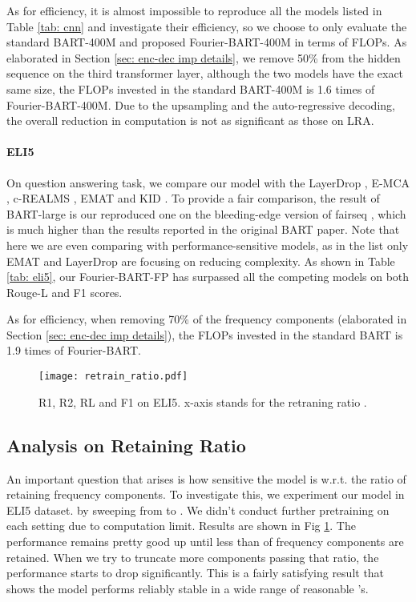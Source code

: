 \documentclass[11pt]{article}
\begin{document}
As for efficiency, it is almost impossible to reproduce all the models listed in Table \ref{tab: cnn} and investigate their efficiency, so we choose to only evaluate the standard BART-400M and proposed Fourier-BART-400M in terms of FLOPs. 
As elaborated in Section \ref{sec: enc-dec imp details}, we remove 50\% from the hidden sequence on the third transformer layer, although the two models have the exact same size, the FLOPs invested in the standard BART-400M is 1.6 times of Fourier-BART-400M. Due to the upsampling and the auto-regressive decoding, the overall reduction in computation is not as significant as those on LRA.


\paragraph{ELI5}
On question answering task, we compare our model with the LayerDrop \citep{fan2019reducing}, E-MCA \citep{fan2019using}, c-REALMS \citep{krishna2021hurdles}, EMAT \citep{wu2022efficient} and KID \citep{liu2022knowledge}. To provide a fair comparison, the result of BART-large is our reproduced one on the bleeding-edge version of fairseq \cite{ott2019fairseq}, which is much higher than the results reported in the original BART paper. Note that here we are even comparing with performance-sensitive models, as in the list only EMAT and LayerDrop are focusing on reducing complexity. As shown in Table \ref{tab: eli5}, our Fourier-BART-FP has surpassed all the competing models on both Rouge-L and F1 scores. 

As for efficiency, when removing 70\% of the frequency components (elaborated in Section \ref{sec: enc-dec imp details}), the FLOPs invested in the standard BART is 1.9 times of Fourier-BART.

\begin{figure}[ht]
\centering
\texttt{[image: retrain\_ratio.pdf]} 
\caption{R1, R2, RL and F1 on ELI5. x-axis stands for the retraning ratio .}
\label{fig: ablation}
\end{figure}


\subsection{Analysis on Retaining Ratio }
An important question that arises is how sensitive the model is w.r.t. the ratio of retaining frequency components. To investigate this, we experiment our model in ELI5 dataset. by sweeping  from  to . We didn't conduct further pretraining on each setting due to computation limit. Results are shown in Fig \ref{fig: ablation}. The performance remains pretty good up until less than  of frequency components are retained. When we try to truncate more components passing that ratio, the performance starts to drop significantly. This is a fairly satisfying result that shows the model performs reliably stable in a wide range of reasonable 's.
\end{document}

